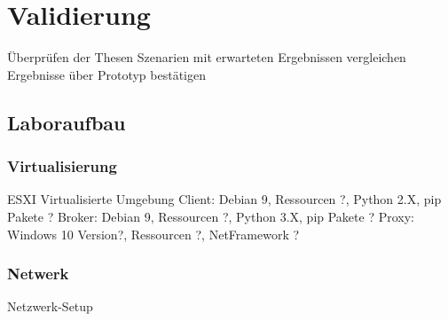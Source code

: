 \chapter{Validierung}
Überprüfen der Thesen
    Szenarien mit erwarteten Ergebnissen vergleichen
    Ergebnisse über Prototyp bestätigen
    
\section{Laboraufbau}
    \subsection{Virtualisierung}
    ESXI
        Virtualisierte Umgebung
        Client: Debian 9, Ressourcen ?, Python 2.X, pip Pakete ?
        Broker: Debian 9, Ressourcen ?, Python 3.X, pip Pakete ?
        Proxy: Windows 10 Version?, Ressourcen ?, NetFramework ?
    \subsection{Netwerk}
    Netzwerk-Setup